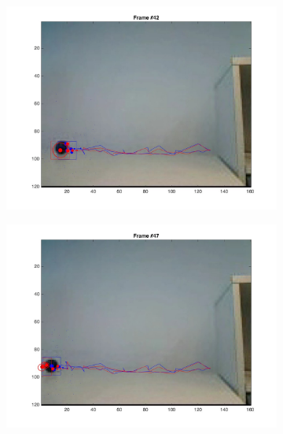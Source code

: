 \documentclass{ethz_report}
\begin{document}
\begin{figure}[h]
\begin{subfigure}[b]{.25\textwidth}
        \includegraphics[width=1\linewidth]{images/video3_particles_low_41}
    \end{subfigure}%
    \begin{subfigure}[b]{.25\textwidth}
        \centering
        \includegraphics[width=1\linewidth]{images/video3_particles_low_46}
    \end{subfigure}%
    \begin{subfigure}[b]{.25\textwidth}
        \centering

\end{subfigure}
\end{figure}
\end{document}
